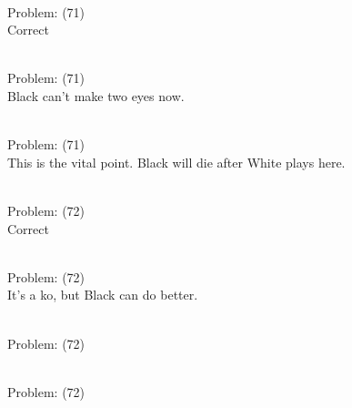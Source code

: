 \documentclass[11pt]{article}
\begin{document}
\begin{minipage}[t]{0.5\textwidth}
  {\centering
  
\\
Problem: (71)\\
Correct\\
  }
\end{minipage}
\begin{minipage}[t]{0.5\textwidth}
  {\centering
  
\\
Problem: (71)\\
Black can't make two eyes now.\\
  }
\end{minipage}
\begin{minipage}[t]{0.5\textwidth}
  {\centering
  
\\
Problem: (71)\\
This is the vital point. Black will die after White plays here.\\
  }
\end{minipage}
\begin{minipage}[t]{0.5\textwidth}
  {\centering
  
\\
Problem: (72)\\
Correct\\
  }
\end{minipage}
\begin{minipage}[t]{0.5\textwidth}
  {\centering
  
\\
Problem: (72)\\
It's a ko, but Black can do better.\\
  }
\end{minipage}
\begin{minipage}[t]{0.5\textwidth}
  {\centering
  
\\
Problem: (72)\\
  }
\end{minipage}
\begin{minipage}[t]{0.5\textwidth}
  {\centering
  
\\
Problem: (72)\\
  }
\end{minipage}
\end{document}
